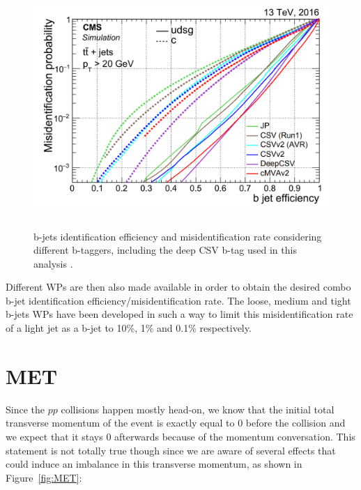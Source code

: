 \documentclass[a4paper, 10pt, openright]{report}
\begin{document}
\begin{figure}[htbp]
\begin{center}
\includegraphics[width=14.5cm, height=9.1cm]{figs/CMSBTag.png}
\caption{b-jets identification efficiency and misidentification rate considering different b-taggers, including the deep CSV b-tag used in this analysis \cite{BTag}.}
\label{fig:CMSBTag}
\end{center}
\end{figure}

Different \acp{WP} are then also made available in order to obtain the desired combo b-jet identification efficiency/misidentification rate. The loose, medium and tight b-jets \acp{WP} have been developed in such a way to limit this misidentification rate of a light jet as a b-jet to 10\%, 1\% and 0.1\% respectively.

\section{\acf{MET}} \label{section:RecoMET}

Since the $pp$ collisions happen mostly head-on, we know that the initial total transverse momentum of the event is exactly equal to 0 before the collision and we expect that it stays 0 afterwards because of the momentum conversation. This statement is not totally true though since we are aware of several effects that could induce an imbalance in this transverse momentum, as shown in Figure~\ref{fig:MET}:
\end{document}
